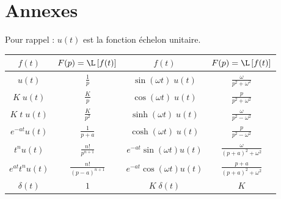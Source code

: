 \section{Annexes}


Pour rappel : $u(t)$ est la fonction échelon unitaire.
\renewcommand\arraystretch{1.3}
\begin{center}
\begin{tabular}{|c|c||c|c|}
	\hline
	$f(t)$			&	$\displaystyle F(p)=\L\left[f(t)\right]$		&	$f(t)$					&	$F(p)=\L\left[f(t)\right]$					\\[0.3cm]
	\hline\hline
	$u(t)$			&	$\displaystyle \frac 1p$				&	$\sin(\omega t)\;u(t)$		&	$\displaystyle \frac{\omega}{p^2+\omega^2}$	\\[0.3cm]
	\hline
	$K\;u(t)$		&	$\displaystyle \frac{K}{p}$			&	$\cos(\omega t)\;u(t)$		&	$\displaystyle \frac{p}{p^2+\omega^2}$		\\[0.3cm]
	\hline
	$K\;t\;u(t)$		&	$\displaystyle \frac K{p^2}$			&	$\sinh(\omega t)\;u(t)$		&	$\displaystyle \frac \omega{p^2-\omega^2}$		\\[0.3cm]
	\hline
	$e^{-at}u(t)$	&	$\displaystyle \frac{1}{p+a}$			&	$\cosh(\omega t)\;u(t)$		&	$\displaystyle \frac{p}{p^2-\omega^2}$		\\[0.3cm]
	\hline
	$t^nu(t)$		&	$\displaystyle \frac{n!}{p^{n+1}}$		&	$e^{-at}\sin(\omega t)u(t)$	&	$\displaystyle \frac \omega{(p+a)^2+\omega^2}$	\\[0.3cm]
	\hline
	$e^{at} t^n u(t)$	&	$\displaystyle \frac{n!}{(p-a)^{n+1}}$		&	$e^{-at}\cos(\omega t) u(t)$	&	$\displaystyle \frac{p+a}{(p+a)^2+\omega^2}$	\\[0.3cm]
	\hline
	$\delta(t)$		&	$1$							&	$K\;\delta(t)$			&	$K$								\\[0.3cm]
	\hline
\end{tabular}
\end{center}
